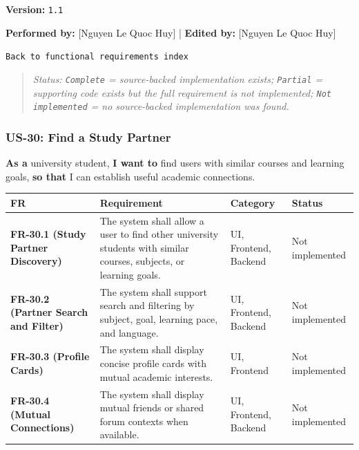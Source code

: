 \documentclass[12pt]{article}
\renewcommand{\baselinestretch}{1.5}
\begin{document}
\textbf{Version:} \texttt{1.1}
\par\medskip

\textbf{Performed by:} [Nguyen Le Quoc Huy] | \textbf{Edited by:} [Nguyen Le Quoc Huy]
\par\medskip

\texttt{Back to functional requirements index}
\par\medskip

\begin{quote}
\textit{Status: \texttt{Complete} = source-backed implementation exists; \texttt{Partial} = supporting code exists but the full requirement is not implemented; \texttt{Not implemented} = no source-backed implementation was found.}
\end{quote}
\par\medskip

\hypertarget{sec:us-30-find-a-study-partner}{}
\subsubsection*{US-30: Find a Study Partner}
\par\medskip

\textbf{As a} university student, \textbf{I want to} find users with similar courses and learning goals, \textbf{so that} I can establish useful academic connections.
\par\medskip

\begingroup
\small
\renewcommand{\baselinestretch}{1.0}\selectfont
\renewcommand{\arraystretch}{1.15}
\setlength{\tabcolsep}{6pt}
\begin{longtable}{|>{\raggedright\arraybackslash}p{}|>{\raggedright\arraybackslash}p{}|>{\raggedright\arraybackslash}p{}|>{\raggedright\arraybackslash}p{}|}
\hline
\textbf{FR} & \textbf{Requirement} & \textbf{Category} & \textbf{Status} \\ \hline
\endhead
\textbf{FR-30.1 (Study Partner Discovery)} & The system shall allow a user to find other university students with similar courses, subjects, or learning goals. & UI, Frontend, Backend & Not implemented \\ \hline
\textbf{FR-30.2 (Partner Search and Filter)} & The system shall support search and filtering by subject, goal, learning pace, and language. & UI, Frontend, Backend & Not implemented \\ \hline
\textbf{FR-30.3 (Profile Cards)} & The system shall display concise profile cards with mutual academic interests. & UI, Frontend & Not implemented \\ \hline
\textbf{FR-30.4 (Mutual Connections)} & The system shall display mutual friends or shared forum contexts when available. & UI, Frontend, Backend & Not implemented \\ \hline
\end{longtable}
\endgroup
\par\medskip
\end{document}
